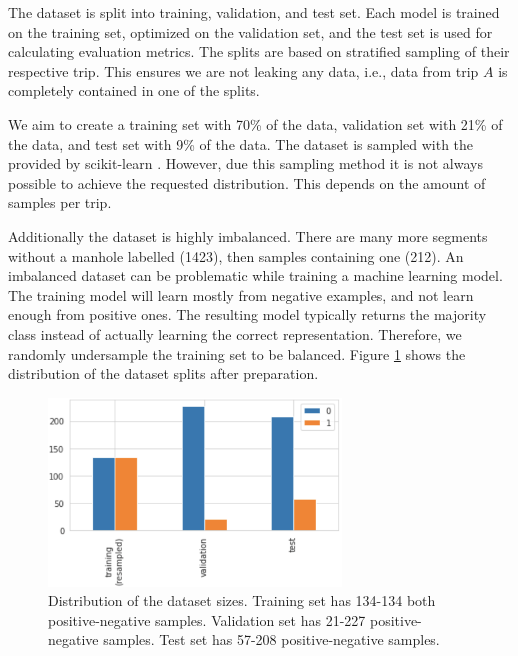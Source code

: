 The dataset is split into training, validation, and test set. Each model is trained on the training set, optimized on the validation set, and the test set is used for calculating evaluation metrics. The splits are based on stratified sampling of their respective trip. This ensures we are not leaking any data, i.e., data from trip $A$ is completely contained in one of the splits.

We aim to create a training set with 70\% of the data, validation set with 21\% of the data, and test set with 9\% of the data. The dataset is sampled with the  provided by scikit-learn \cite{scikit}. However, due this sampling method it is not always possible to achieve the requested distribution. This depends on the amount of samples per trip.

Additionally the dataset is highly imbalanced. There are many more segments without a manhole labelled (1423), then samples containing one (212). An imbalanced dataset can be problematic while training a machine learning model. The training model will learn mostly from negative examples, and not learn enough from positive ones. The resulting model typically returns the majority class instead of actually learning the correct representation. Therefore, we randomly undersample the training set to be balanced. Figure \ref{fig:proportion-splits} shows the distribution of the dataset splits after preparation.

\begin{figure}[ht]
\begin{center}
\includegraphics[height=5cm,keepaspectratio]{images/5_multimodal_fusion/proportion-splits.png}
\captionsetup{width=.95\textwidth}
\caption{Distribution of the dataset sizes. Training set has 134-134 both positive-negative samples. Validation set has 21-227 positive-negative samples. Test set has 57-208 positive-negative samples.}
\label{fig:proportion-splits}
\end{center}
\end{figure}



